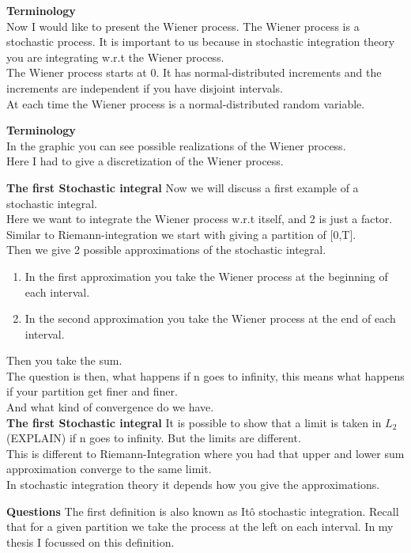 \documentclass[10pt,a4paper,titlepage, openany]{memoir} %
\begin{document}
\textbf{Terminology}\\
Now I would like to present the Wiener process. The Wiener process is a stochastic process. It is important to us because in stochastic integration theory you are integrating w.r.t the Wiener process.\\
The Wiener process starts at 0. It has normal-distributed increments and the increments are independent if you have disjoint intervals.\\
At each time the Wiener process is a normal-distributed random variable.

\textbf{Terminology}\\
In the graphic you can see possible realizations of the Wiener process.\\
Here I had to give a discretization of the Wiener process.

\newpage

\textbf{The first Stochastic integral}
Now we will discuss a first example of a stochastic integral.\\
Here we want to integrate the Wiener process w.r.t itself, and 2 is just a factor.\\
Similar to Riemann-integration we start with giving a partition of [0,T].\\
Then we give 2 possible approximations of the stochastic integral.
\begin{enumerate}
\item In the first approximation you take the Wiener process at the beginning of each interval.
\item In the second approximation you take the Wiener process at the end of each interval.
\end{enumerate}
Then you take the sum.\\
The question is then, what happens if n goes to infinity, this means what happens if your partition get finer and finer.\\
And what kind of convergence do we have.\\

\textbf{The first Stochastic integral}
It is possible to show that a limit is taken in \(L_2\) (EXPLAIN) if n goes to infinity. But the limits are different.\\
This is different to Riemann-Integration where you had that upper and lower sum approximation converge to the same limit.\\
In stochastic integration theory it depends how you give the approximations.


\textbf{Questions}
The first definition is also known as It\^o stochastic integration. Recall that for a given partition we take the process at the left on each interval. In my thesis I focussed on this definition.\\
\end{document}
